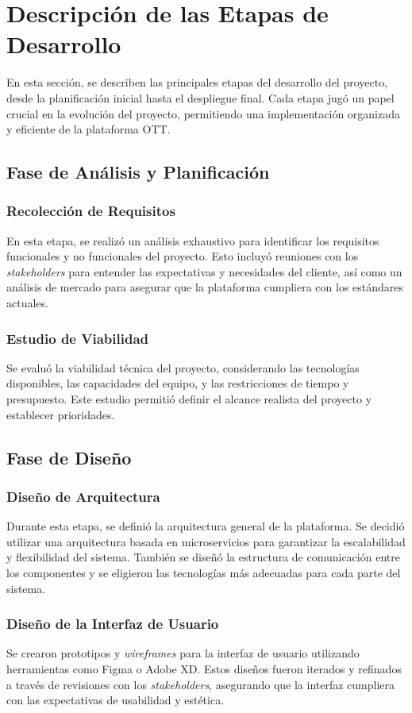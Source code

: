 \section{Descripción de las Etapas de Desarrollo}
En esta sección, se describen las principales etapas del desarrollo del proyecto, 
desde la planificación inicial hasta el despliegue final. Cada etapa jugó un papel 
crucial en la evolución del proyecto, permitiendo una implementación organizada y eficiente de la plataforma OTT.

\subsection{Fase de Análisis y Planificación}
\subsubsection{Recolección de Requisitos}
En esta etapa, se realizó un análisis exhaustivo para identificar los requisitos 
funcionales y no funcionales del proyecto. Esto incluyó reuniones con los \textit{stakeholders} 
para entender las expectativas y necesidades del cliente, así como un análisis de mercado para
 asegurar que la plataforma cumpliera con los estándares actuales.


\subsubsection{Estudio de Viabilidad}
Se evaluó la viabilidad técnica del proyecto, considerando las tecnologías disponibles, 
las capacidades del equipo, y las restricciones de tiempo y presupuesto. Este estudio 
permitió definir el alcance realista del proyecto y establecer prioridades.

\subsection{Fase de Diseño}
\subsubsection{Diseño de Arquitectura}
Durante esta etapa, se definió la arquitectura general de la plataforma. Se decidió utilizar 
una arquitectura basada en microservicios para garantizar la escalabilidad y flexibilidad del 
sistema. También se diseñó la estructura de comunicación entre los componentes y se eligieron 
las tecnologías más adecuadas para cada parte del sistema.

\subsubsection{Diseño de la Interfaz de Usuario}
Se crearon prototipos y \textit{wireframes} para la interfaz de usuario utilizando herramientas 
como Figma o Adobe XD. Estos diseños fueron iterados y refinados a través de revisiones con los 
\textit{stakeholders}, asegurando que la interfaz cumpliera con las expectativas de usabilidad y estética.

